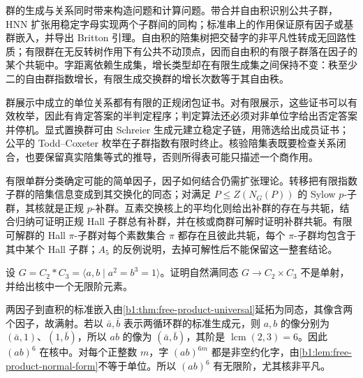 






\begin{chaptersummary}
	群的生成与关系同时带来构造问题和计算问题。带合并自由积识别公共子群，HNN 扩张用稳定字母实现两个子群间的同构；标准串上的作用保证原有因子或基群嵌入，并导出 Britton 引理。自由积的陪集树把交替字的非平凡性转成无回路性质；有限群在无反转树作用下有公共不动顶点，因而自由积的有限子群落在因子的某个共轭中。字距离依赖生成集，增长类型却在有限生成集之间保持不变：秩至少二的自由群指数增长，有限生成交换群的增长次数等于其自由秩。

	\ProseParagraphBreak
	群展示中成立的单位关系都有有限的正规闭包证书。对有限展示，这些证书可以有效枚举，因此有肯定答案的半判定程序；判定算法还必须对非单位字给出否定答案并停机。显式置换群可由 Schreier 生成元建立稳定子链，用筛选给出成员证书；公平的 Todd--Coxeter 枚举在子群指数有限时终止。核验陪集表既要检查关系闭合，也要保留真实陪集等式的推导，否则所得表可能只描述一个商作用。

	\ProseParagraphBreak
	有限单群分类确定可能的简单因子，因子如何结合仍需扩张理论。转移把有限指数子群的陪集信息变成到其交换化的同态；对满足 \(P\leq Z(N_G(P))\) 的 Sylow \(p\)-子群，其核就是正规 \(p\)-补群。互素交换核上的平均化则给出补群的存在与共轭，结合归纳可证明正规 Hall 子群总有补群，并在核或商群可解时证明补群共轭。有限可解群的 Hall \(\pi\)-子群对每个素数集合 \(\pi\) 都存在且彼此共轭，每个 \(\pi\)-子群均包含于其中某个 Hall 子群；\(A_5\) 的反例说明，去掉可解性后不能保留这一整套结论。
\end{chaptersummary}

\BookExercises

\begin{exercise}\label{b1:ex:C-free-product-quotient}
	设 \(G=C_2*C_3=\langle a,b\mid a^2=b^3=1\rangle\)。证明自然满同态 \(G\rightarrow C_2\times C_3\) 不是单射，并给出核中一个无限阶元素。
\end{exercise}

\begin{solution}
	两因子到直积的标准嵌入由\cref{b1:thm:free-product-universal}延拓为同态，其像含两个因子，故满射。若以 \(\bar a,\bar b\) 表示两循环群的标准生成元，则 \(a,b\) 的像分别为 \((\bar a,1)\)、\((1,\bar b)\)，所以 \(ab\) 的像为 \((\bar a,\bar b)\)，其阶是 \(\operatorname{lcm}(2,3)=6\)。因此 \((ab)^6\) 在核中。对每个正整数 \(m\)，字 \((ab)^{6m}\) 都是非空约化字，由\cref{b1:lem:free-product-normal-form}不等于单位。所以 \((ab)^6\) 有无限阶，尤其核非平凡。
\end{solution}

